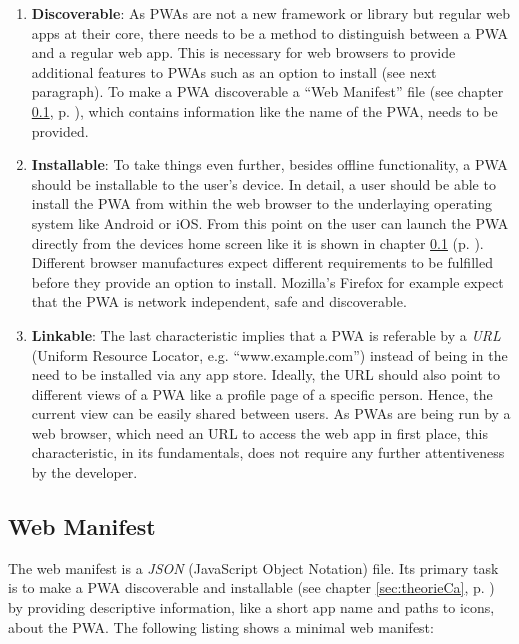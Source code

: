 \begin{enumerate}
	\item \textbf{Discoverable}: As PWAs are not a new framework or library but regular web apps at their core, there needs to be a method to distinguish between a PWA and a regular web app. This is necessary for web browsers to provide additional features to PWAs such as an option to install (see next paragraph). To make a PWA discoverable a “Web Manifest” file (see chapter \ref{sec:theorieCb}, p. \pageref{sec:theorieCb}), which contains information like the name of the PWA, needs to be provided. \cite[p. 118]{liebelProgressiveWebApps2019}

	\item \textbf{Installable}: To take things even further, besides offline functionality, a PWA should be installable to the user’s device. In detail, a user should be able to install the PWA from within the web browser to the underlaying operating system like Android or iOS. From this point on the user can launch the PWA directly from the devices home screen like it is shown in chapter \ref{sec:theorieCb} (p. \pageref{sec:theorieCb}). Different browser manufactures expect different requirements to be fulfilled before they provide an option to install. Mozilla’s Firefox for example expect that the PWA is network independent, safe and discoverable. \cite{HowMakePWAs}

	\item \textbf{Linkable}: The last characteristic implies that a PWA is referable by a \textit{URL} (Uniform Resource Locator, e.g. “www.example.com”) instead of being in the need to be installed via any app store. Ideally, the URL should also point to different views of a PWA like a profile page of a specific person. Hence, the current view can be easily shared between users. As PWAs are being run by a web browser, which need an URL to access the web app in first place, this characteristic, in its fundamentals, does not require any further attentiveness by the developer. \cite[pp. 126-127]{liebelProgressiveWebApps2019}
\end{enumerate}

\subsection{Web Manifest}
\label{sec:theorieCb}

The web manifest is a \textit{JSON} (JavaScript Object Notation) file. Its primary task is to make a PWA discoverable and installable (see chapter \ref{sec:theorieCa}, p. \pageref{sec:theorieCa}) by providing descriptive information, like a short app name and paths to icons, about the PWA. 
The following listing shows a minimal web manifest:

